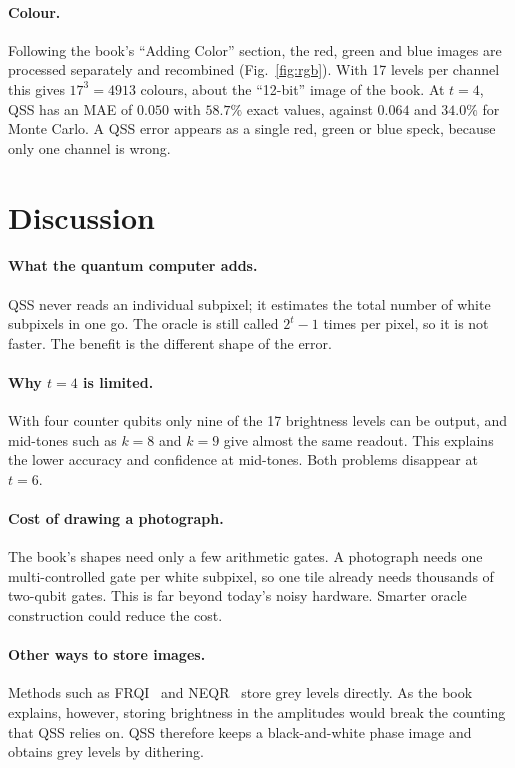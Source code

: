 \documentclass[10pt,twocolumn,a4paper]{article}
\begin{document}
\paragraph{Colour.}
Following the book's ``Adding Color'' section, the red, green and blue images
are processed separately and recombined (Fig.~\ref{fig:rgb}). With 17 levels per
channel this gives $17^3=4913$ colours, about the ``12-bit'' image of the book.
At $t=4$, QSS has an MAE of $0.050$ with $58.7\%$ exact values, against $0.064$
and $34.0\%$ for Monte Carlo. A QSS error appears as a single red, green or blue
speck, because only one channel is wrong.

\section{Discussion}\label{sec:disc}

\paragraph{What the quantum computer adds.}
QSS never reads an individual subpixel; it estimates the total number of white
subpixels in one go. The oracle is still called $2^t-1$ times per pixel, so it
is not faster. The benefit is the different shape of the error.

\paragraph{Why $t=4$ is limited.}
With four counter qubits only nine of the 17 brightness levels can be output,
and mid-tones such as $k=8$ and $k=9$ give almost the same readout. This
explains the lower accuracy and confidence at mid-tones. Both problems
disappear at $t=6$.

\paragraph{Cost of drawing a photograph.}
The book's shapes need only a few arithmetic gates. A photograph needs one
multi-controlled gate per white subpixel, so one tile already needs thousands
of two-qubit gates. This is far beyond today's noisy hardware. Smarter oracle
construction could reduce the cost.

\paragraph{Other ways to store images.}
Methods such as FRQI~\cite{frqi} and NEQR~\cite{neqr} store grey levels
directly. As the book explains, however, storing brightness in the amplitudes
would break the counting that QSS relies on. QSS therefore keeps a
black-and-white phase image and obtains grey levels by dithering.
\end{document}
